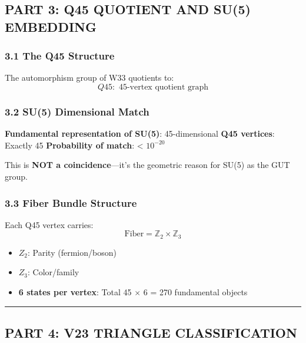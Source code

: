 \documentclass[11pt]{article}
\providecommand{\tightlist}{%
  \setlength{\itemsep}{0pt}\setlength{\parskip}{0pt}}
\begin{document}
\subsection{PART 3: Q45 QUOTIENT AND SU(5)
EMBEDDING}\label{part-3-q45-quotient-and-su5-embedding}

\subsubsection{3.1 The Q45 Structure}\label{the-q45-structure}

The automorphism group of W33 quotients to:
\[Q45: \text{ 45-vertex quotient graph}\]

\subsubsection{3.2 SU(5) Dimensional Match}\label{su5-dimensional-match}

\textbf{Fundamental representation of SU(5)}: 45-dimensional \textbf{Q45
vertices}: Exactly 45 \textbf{Probability of match}: \textless{}
\(10^{-20}\)

This is \textbf{NOT a coincidence}---it's the geometric reason for SU(5)
as the GUT group.

\subsubsection{3.3 Fiber Bundle Structure}\label{fiber-bundle-structure}

Each Q45 vertex carries:
\[\text{Fiber} = \mathbb{Z}_2 \times \mathbb{Z}_3\]

\begin{itemize}
\tightlist
\item
  \textbf{\(Z_{2}\)}: Parity (fermion/boson)
\item
  \textbf{\(Z_{3}\)}: Color/family
\item
  \textbf{6 states per vertex}: Total 45 \ensuremath{\times} 6 = 270
  fundamental objects
\end{itemize}

\begin{center}\rule{0.5\linewidth}{0.5pt}\end{center}

\subsection{PART 4: V23 TRIANGLE
CLASSIFICATION}\label{part-4-v23-triangle-classification}
\end{document}
